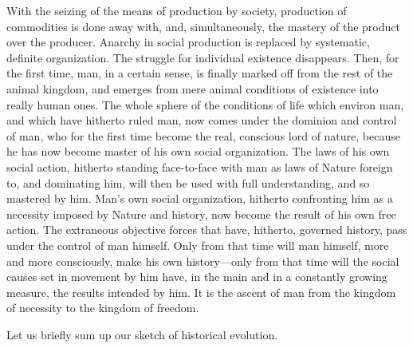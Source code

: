 With the seizing of the means of production by society, production of
commodities is done away with, and, simultaneously, the mastery of the product
over the producer. Anarchy in social production is replaced by systematic,
definite organization. The struggle for individual existence disappears. Then,
for the first time, man, in a certain sense, is finally marked off from the rest
of the animal kingdom, and emerges from mere animal conditions of existence into
really human ones. The whole sphere of the conditions of life which environ man,
and which have hitherto ruled man, now comes under the dominion and control of
man, who for the first time become the real, conscious lord of nature, because
he has now become master of his own social organization. The laws of his own
social action, hitherto standing face-to-face with man as laws of Nature foreign
to, and dominating him, will then be used with full understanding, and so
mastered by him. Man's own social organization, hitherto confronting him as a
necessity imposed by Nature and history, now become the result of his own free
action. The extraneous objective forces that have, hitherto, governed history,
pass under the control of man himself. Only from that time will man himself,
more and more consciously, make his own history---only from that time will the
social causes set in movement by him have, in the main and in a constantly
growing measure, the results intended by him. It is the ascent of man from the
kingdom of necessity to the kingdom of freedom.

Let us briefly sum up our sketch of historical evolution.

